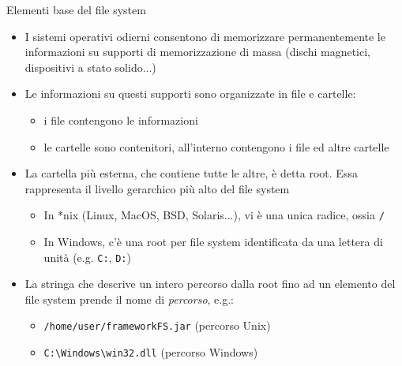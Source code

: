\documentclass[presentation]{beamer}
\begin{document}
\begin{frame}{Elementi base del file system}
  \begin{itemize}
    \item I sistemi operativi odierni consentono di memorizzare permanentemente le informazioni su 
supporti di memorizzazione di massa (dischi magnetici, dispositivi a stato solido...)
    \item Le informazioni su questi supporti sono organizzate in file e cartelle:
      \begin{itemize}
        \item i file contengono le informazioni
        \item le cartelle sono contenitori, all'interno contengono i file ed altre cartelle
      \end{itemize}
    \item La cartella più esterna, che contiene tutte le altre, è detta root. Essa rappresenta il livello gerarchico più alto del file system
      \begin{itemize}
        \item In *nix (Linux, MacOS, BSD, Solaris...), vi è una unica radice, ossia \texttt{/}
        \item In Windows, c'è una root per file system identificata da una lettera di unità (e.g. 
\texttt{C:}, \texttt{D:})
      \end{itemize}
    \item La stringa che descrive un intero percorso dalla root fino ad un elemento del file system
prende il nome di \emph{percorso}, e.g.:
    \begin{itemize}
        \item \texttt{/home/user/frameworkFS.jar} (percorso Unix)
        \item \texttt{C:\textbackslash{}Windows\textbackslash{}win32.dll} (percorso Windows)
    \end{itemize}
  \end{itemize}
\end{frame}
\end{document}
